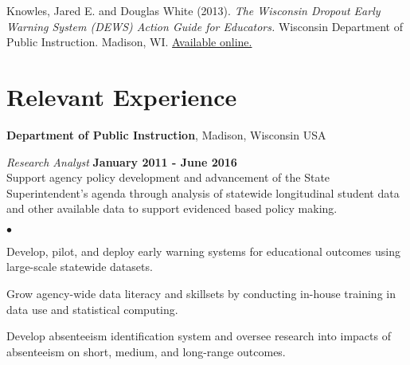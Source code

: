 \documentclass[margin,line]{res}
\newenvironment{list2}{
  \begin{list}{$\bullet$}{%
      \setlength{\itemsep}{0in}
      \setlength{\parsep}{0in} \setlength{\parskip}{0in}
      \setlength{\topsep}{0in} \setlength{\partopsep}{0in} 
      \setlength{\leftmargin}{0.2in}}}{\end{list}}
\begin{document}
\begin{resume}
Knowles, Jared E. and Douglas White (2013). \emph{The Wisconsin Dropout Early 
Warning System (DEWS) Action Guide for Educators.} Wisconsin Department of Public 
Instruction. Madison, WI. \href{http://dpi.wi.gov/dews}{Available online.}



% 
% 
% 

\vspace*{2.5mm}

\section{\sc Relevant Experience}
{\bf Department of Public Instruction}, Madison, Wisconsin USA

\vspace{-.3cm}
{\em Research Analyst} \hfill {\bf January 2011 - June 2016}\\
Support agency policy development and advancement of the State Superintendent's agenda through analysis of statewide longitudinal student data and other available data to support evidenced based policy making. 
\begin{list2}
\item Develop, pilot, and deploy early warning systems for educational outcomes using large-scale statewide datasets. 
\item Grow agency-wide data literacy and skillsets by conducting in-house training in data use and statistical computing.
\item Develop absenteeism identification system and oversee research into impacts of 
absenteeism on short, medium, and long-range outcomes.
\end{list2}


\end{resume}
\end{document}
